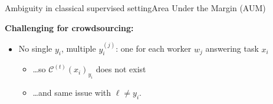 \begin{frame}{Ambiguity in classical supervised setting}{Area Under the Margin (AUM)}

\vspace{0.6cm}

\pause
\textbf{Challenging for crowdsourcing:}
\begin{itemize}[label=$\bullet$]
    \item No single $y_i$, multiple $y_i^{(j)}$: one for each worker $w_j$ answering task $x_i$
          \begin{itemize}[label=$\blacktriangleright$]
              \pause
              \item \dots so $\mathcal{C}^{(t)}(x_i)_{y_i}$ does not exist \pause
              \item \dots and same issue with $\ell \neq y_i$.
          \end{itemize}
\end{itemize}
\end{frame}

